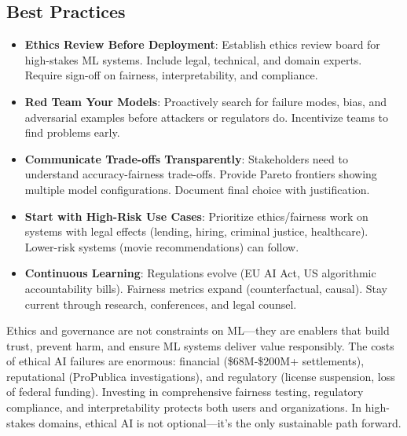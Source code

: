 \subsection{Best Practices}
\begin{itemize}
    \item \textbf{Ethics Review Before Deployment}: Establish ethics review board for high-stakes ML systems. Include legal, technical, and domain experts. Require sign-off on fairness, interpretability, and compliance.
    \item \textbf{Red Team Your Models}: Proactively search for failure modes, bias, and adversarial examples before attackers or regulators do. Incentivize teams to find problems early.
    \item \textbf{Communicate Trade-offs Transparently}: Stakeholders need to understand accuracy-fairness trade-offs. Provide Pareto frontiers showing multiple model configurations. Document final choice with justification.
    \item \textbf{Start with High-Risk Use Cases}: Prioritize ethics/fairness work on systems with legal effects (lending, hiring, criminal justice, healthcare). Lower-risk systems (movie recommendations) can follow.
    \item \textbf{Continuous Learning}: Regulations evolve (EU AI Act, US algorithmic accountability bills). Fairness metrics expand (counterfactual, causal). Stay current through research, conferences, and legal counsel.
\end{itemize}

Ethics and governance are not constraints on ML---they are enablers that build trust, prevent harm, and ensure ML systems deliver value responsibly. The costs of ethical AI failures are enormous: financial (\$68M-\$200M+ settlements), reputational (ProPublica investigations), and regulatory (license suspension, loss of federal funding). Investing in comprehensive fairness testing, regulatory compliance, and interpretability protects both users and organizations. In high-stakes domains, ethical AI is not optional---it's the only sustainable path forward.
